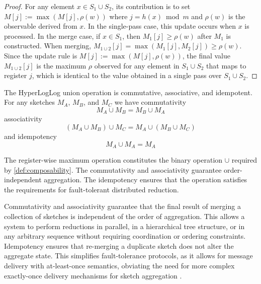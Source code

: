 \begin{proof}
    For any element $x \in S_1 \cup S_2$, its contribution is to set $M[j] := \max(M[j], \rho(w))$ where $j = h(x) \bmod m$ and $\rho(w)$ is the observable derived from $x$. In the single-pass case, this update occurs when $x$ is processed. In the merge case, if $x \in S_1$, then $M_1[j] \geq \rho(w)$ after $M_1$ is constructed. When merging, $M_{1 \cup 2}[j] = \max(M_1[j], M_2[j]) \geq \rho(w)$. Since the update rule is $M[j] := \max(M[j], \rho(w))$, the final value $M_{1 \cup 2}[j]$ is the maximum $\rho$ observed for any element in $S_1 \cup S_2$ that maps to register $j$, which is identical to the value obtained in a single pass over $S_1 \cup S_2$.
\end{proof}

\begin{theorem} \label{thm:hll-union-properties}
    The HyperLogLog union operation is commutative, associative, and idempotent. For any sketches $M_A$, $M_B$, and $M_C$ we have commutativity
    \begin{equation*}
        M_A \cup M_B = M_B \cup M_A
    \end{equation*}
    associativity
    \begin{equation*}
        (M_A \cup M_B) \cup M_C = M_A \cup (M_B \cup M_C)
    \end{equation*}
    and idempotency
    \begin{equation*}
        M_A \cup M_A = M_A
    \end{equation*}


\end{theorem}

The register-wise maximum operation constitutes the binary operation $\cup$ required by \ref{def:composability}. The commutativity and associativity guarantee order-independent aggregation. The idempotency ensures that the operation satisfies the requirements for fault-tolerant distributed reduction.

Commutativity and associativity guarantee that the final result of merging a collection of sketches is independent of the order of aggregation. This allows a system to perform reductions in parallel, in a hierarchical tree structure, or in any arbitrary sequence without requiring coordination or ordering constraints. Idempotency ensures that re-merging a duplicate sketch does not alter the aggregate state. This simplifies fault-tolerance protocols, as it allows for message delivery with at-least-once semantics, obviating the need for more complex exactly-once delivery mechanisms for sketch aggregation \cite{Heule2013HyperLogLogIP}.

